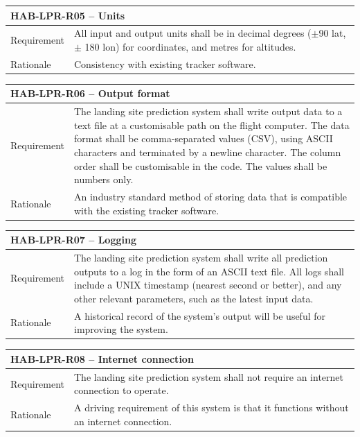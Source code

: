 \documentclass[11pt]{article}
\begin{document}
\begin{table}[!h] \centering
 \begin{tabular}{|p{2cm} p{11cm}|}
 \hline
  \multicolumn{2}{|l|}{HAB-LPR-R05 – Units} \\
  \hline
  Requirement & All input and output units shall be in decimal degrees ($\pm $90 lat, $\pm$ 180 lon) for coordinates, and metres for altitudes.  \\
  \hline
  Rationale & Consistency with existing tracker software. \\
  \hline
 \end{tabular}
\end{table}

\begin{table}[!h] \centering
 \begin{tabular}{|p{2cm} p{11cm}|}
 \hline
  \multicolumn{2}{|l|}{HAB-LPR-R06 – Output format} \\
  \hline
  Requirement & The landing site prediction system shall write output data to a text file at a customisable path on the flight computer. The data format shall be comma-separated values (CSV), using ASCII characters and terminated by a newline character. The column order shall be customisable in the code. The values shall be numbers only. \\
  \hline
  Rationale & An industry standard method of storing data that is compatible with the existing tracker software.  \\
  \hline
 \end{tabular}
\end{table}

\begin{table}[!h] \centering
 \begin{tabular}{|p{2cm} p{11cm}|}
 \hline
  \multicolumn{2}{|l|}{HAB-LPR-R07 – Logging} \\
  \hline
  Requirement & The landing site prediction system shall write all prediction outputs to a log in the form of an ASCII text file. All logs shall include a UNIX timestamp (nearest second or better), and any other relevant parameters, such as the latest input data.  \\
  \hline
  Rationale & A historical record of the system’s output will be useful for improving the system.   \\
  \hline
 \end{tabular}
\end{table}

\begin{table}[!h] \centering
 \begin{tabular}{|p{2cm} p{11cm}|}
 \hline
  \multicolumn{2}{|l|}{HAB-LPR-R08 – Internet connection} \\
  \hline
  Requirement & The landing site prediction system shall not require an internet connection to operate. \\
  \hline
  Rationale & A driving requirement of this system is that it functions without an internet connection.  \\
  \hline
 \end{tabular}
\end{table}
\end{document}
